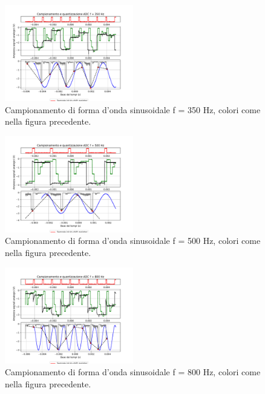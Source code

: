 \documentclass[journal]{IEEEtran}
\begin{document}
\vspace{-10mm}
%
\begin{figure}[H]%
\begin{center}
\includegraphics[trim={0 40 0 0}, clip,width=0.50\textwidth]{analysis/output/campionamento_350Hz.pdf}
\caption{Campionamento di forma d'onda sinusoidale f = 350 Hz, colori come nella figura precedente.}
\label{fig:sampSH4}
\end{center}
\end{figure}
\vspace{-10mm}
%
\begin{figure}[H]%
\begin{center}
\includegraphics[trim={0 40 0 0}, clip,width=0.50\textwidth]{analysis/output/campionamento_500Hz.pdf}
\caption{Campionamento di forma d'onda sinusoidale f = 500 Hz, colori come nella figura precedente.}
\label{fig:sampSH5}
\end{center}
\end{figure}
\vspace{-10mm}
%
\begin{figure}[H]%
\begin{center}
\includegraphics[trim={0 40 0 0}, clip,width=0.50\textwidth]{analysis/output/campionamento_800Hz.pdf}
\caption{Campionamento di forma d'onda sinusoidale f = 800 Hz, colori come nella figura precedente.}
\label{fig:sampSH6}
\end{center}
\end{figure}
\end{document}
